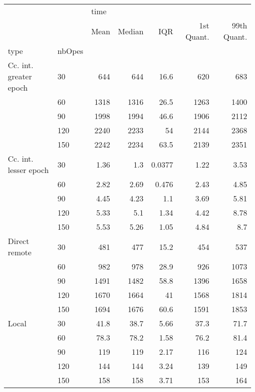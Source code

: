 \begin{tabular}{llrrrrr}
\toprule
      &     & \multicolumn{5}{l}{time} \\
      &     & Mean & Median &    IQR & 1st Quant. & 99th Quant. \\
type & nbOpes &      &        &        &            &             \\
\midrule
Cc. int. greater epoch & 30  &  644 &    644 &   16.6 &        620 &         683 \\
      & 60  & 1318 &   1316 &   26.5 &       1263 &        1400 \\
      & 90  & 1998 &   1994 &   46.6 &       1906 &        2112 \\
      & 120 & 2240 &   2233 &     54 &       2144 &        2368 \\
      & 150 & 2242 &   2234 &   63.5 &       2139 &        2351 \\
Cc. int. lesser epoch & 30  & 1.36 &    1.3 & 0.0377 &       1.22 &        3.53 \\
      & 60  & 2.82 &   2.69 &  0.476 &       2.43 &        4.85 \\
      & 90  & 4.45 &   4.23 &    1.1 &       3.69 &        5.81 \\
      & 120 & 5.33 &    5.1 &   1.34 &       4.42 &        8.78 \\
      & 150 & 5.53 &   5.26 &   1.05 &       4.84 &         8.7 \\
Direct remote & 30  &  481 &    477 &   15.2 &        454 &         537 \\
      & 60  &  982 &    978 &   28.9 &        926 &        1073 \\
      & 90  & 1491 &   1482 &   58.8 &       1396 &        1658 \\
      & 120 & 1670 &   1664 &     41 &       1568 &        1814 \\
      & 150 & 1694 &   1676 &   60.6 &       1591 &        1853 \\
Local & 30  & 41.8 &   38.7 &   5.66 &       37.3 &        71.7 \\
      & 60  & 78.3 &   78.2 &   1.58 &       76.2 &        81.4 \\
      & 90  &  119 &    119 &   2.17 &        116 &         124 \\
      & 120 &  144 &    144 &   3.24 &        139 &         149 \\
      & 150 &  158 &    158 &   3.71 &        153 &         164 \\
\bottomrule
\end{tabular}
